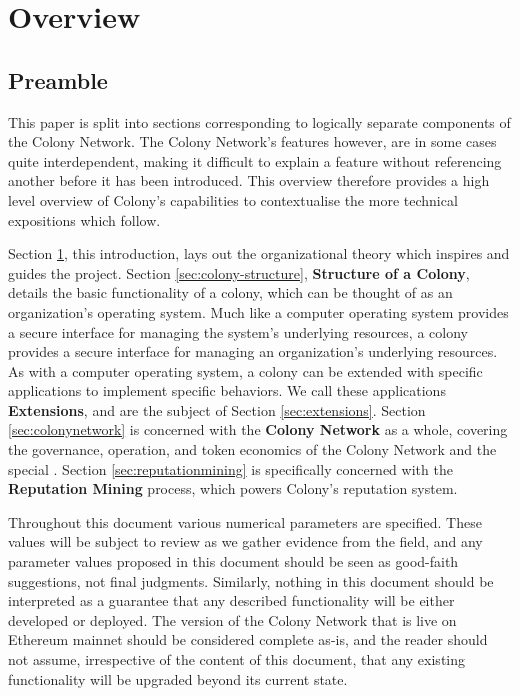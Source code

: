 \section{Overview}\label{sec:overview}

\subsection{Preamble}

This paper is split into sections corresponding to logically separate components of the Colony Network. The Colony Network’s features however, are in some cases quite interdependent, making it difficult to explain a feature without referencing another before it has been introduced. This overview therefore provides a high level overview of Colony’s capabilities to contextualise the more technical expositions which follow.

Section \ref{sec:overview}, this introduction, lays out the organizational theory which inspires and guides the project. Section \ref{sec:colony-structure}, \textbf{Structure of a Colony}, details the basic functionality of a colony, which can be thought of as an organization’s operating system. Much like a computer operating system provides a secure interface for managing the system’s underlying resources, a colony provides a secure interface for managing an organization’s underlying resources. As with a computer operating system, a colony can be extended with specific applications to implement specific behaviors. We call these applications \textbf{Extensions}, and are the subject of Section \ref{sec:extensions}. Section \ref{sec:colonynetwork} is concerned with the \textbf{Colony Network} as a whole, covering the governance, operation, and token economics of the Colony Network and the special \rc. Section \ref{sec:reputationmining} is specifically concerned with the \textbf{Reputation Mining} process, which powers Colony’s reputation system.

Throughout this document various numerical parameters are specified. These values will be subject to review as we gather evidence from the field, and any parameter values proposed in this document should be seen as good-faith suggestions, not final judgments. Similarly, nothing in this document should be interpreted as a guarantee that any described functionality will be either developed or deployed. The version of the Colony Network that is live on Ethereum mainnet should be considered complete as-is, and the reader should not assume, irrespective of the content of this document, that any existing functionality will be upgraded beyond its current state.

